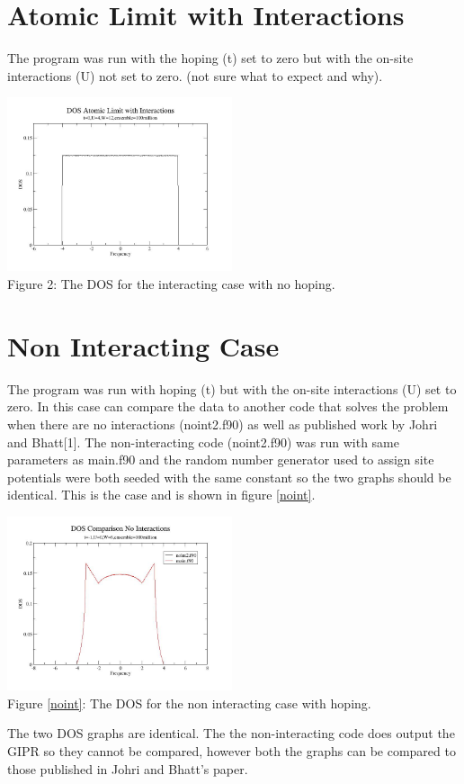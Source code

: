 \documentclass{article}
\begin{document}
\section{Atomic Limit with Interactions}
The program was run with the hoping (t) set to zero but with the on-site interactions (U) not set to zero. (not sure what to expect and why).

\begin{center}
	\includegraphics[width=250px]{dos2_t0u4w12.jpg} \\
	Figure 2: The DOS for the interacting case with no hoping.
\end{center}

\section{Non Interacting Case}
The program was run with hoping (t) but with the on-site interactions (U) set to zero. In this case can compare the data to another code that solves the problem when there are no interactions (noint2.f90) as well as published work by Johri and Bhatt[1]. The non-interacting code (noint2.f90) was run with same parameters as main.f90 and the random number generator used to assign site potentials were both seeded with the same constant so the two graphs should be identical. This is the case and is shown in figure \ref{noint}.
\begin{center} 
	\includegraphics[width=250px]{dos_compareu0.jpg} \\ \label{noint}
	Figure \ref{noint}: The DOS for the non interacting case with hoping.
\end{center}
The two DOS graphs are identical. The the non-interacting code does output the GIPR so they cannot be compared, however both the graphs can be compared to those published in Johri and Bhatt's paper. 
\end{document}
